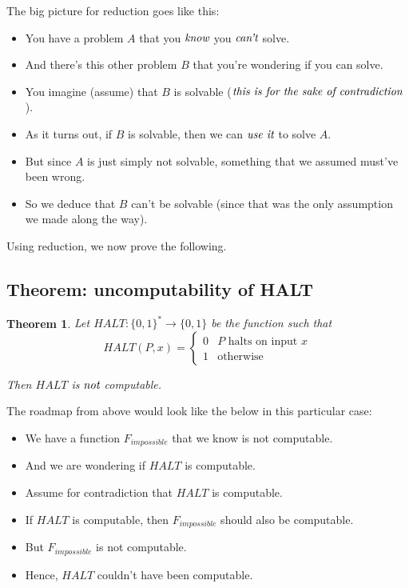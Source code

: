 \documentclass[11pt]{article}
\newtheorem{theorem}{Theorem}
\theoremstyle{definition}
\theoremstyle{remark}
\begin{document}
The big picture for reduction goes like this:
\begin{itemize}
    \item{
            You have a problem $A$ that you $\emph{know}$ you $\emph{can't}$ solve.
        }
    \item{
        And there's this other problem $B$ that you're wondering if you can solve.
        }
    \item{
            You imagine (assume) that $B$ is solvable ($\emph{this is for the sake of contradiction}$).
        }
    \item{
        As it turns out, if $B$ is solvable, then we can $\emph{use it}$ to solve $A$.
        }
    \item{
        But since $A$ is just simply not solvable, something that we assumed must've been wrong.
        }
    \item{
        So we deduce that $B$ can't be solvable (since that was the only assumption we made along the way).
        }
\end{itemize}

Using reduction, we now prove the following.

\subsection{Theorem: uncomputability of HALT}

\begin{theorem}
    Let $HALT: \{0, 1\}^* \rightarrow \{0, 1\}$ be the function such that
    \begin{equation*}
        HALT(P, x) = \begin{cases}
            0 & \text{$P$ halts on input $x$} \\
            1 & \text{otherwise}
        \end{cases}
    \end{equation*}

    Then $HALT$ is $\emph{not}$ computable.
\end{theorem}

The roadmap from above would look like the below in this particular case:

\begin{itemize}
    \item{
            We have a function $F_{impossible}$ that we know is not computable.
        }
    \item{
            And we are wondering if $HALT$ is computable.
        }
    \item{
            Assume for contradiction that $HALT$ is computable.
        }
    \item{
            If $HALT$ is computable, then $F_{impossible}$ should also be computable.
        }
    \item{
            But $F_{impossible}$ is not computable.
        }
    \item{
            Hence, $HALT$ couldn't have been computable.
        }
\end{itemize}
\end{document}
